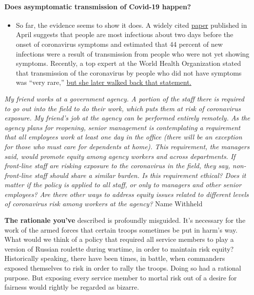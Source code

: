 \begin{itemize}
{  \paragraph{Does asymptomatic transmission of Covid-19
  happen?}\label{does-asymptomatic-transmission-of-covid-19-happen}}

  \begin{itemize}
  \tightlist
  \item
    So far, the evidence seems to show it does. A widely cited
    \href{https://www.nature.com/articles/s41591-020-0869-5}{paper}
    published in April suggests that people are most infectious about
    two days before the onset of coronavirus symptoms and estimated that
    44 percent of new infections were a result of transmission from
    people who were not yet showing symptoms. Recently, a top expert at
    the World Health Organization stated that transmission of the
    coronavirus by people who did not have symptoms was ``very rare,''
    \href{https://www.nytimes.com/2020/06/09/world/coronavirus-updates.html?action=click\&pgtype=Article\&state=default\&region=MAIN_CONTENT_3\&context=storylines_faq\#link-1f302e21}{but
    she later walked back that statement.}
  \end{itemize}
\end{itemize}

\emph{My friend works at a government agency. A portion of the staff
there is required to go out into the field to do their work, which puts
them at risk of coronavirus exposure. My friend's job at the agency can
be performed entirely remotely. As the agency plans for reopening,
senior management is contemplating a requirement that all employees work
at least one day in the office (there will be an exception for those who
must care for dependents at home). This requirement, the managers said,
would promote equity among agency workers and across departments. If
front-line staff are risking exposure to the coronavirus in the field,
they say, non-front-line staff should share a similar burden. Is this
requirement ethical? Does it matter if the policy is applied to all
staff, or only to managers and other senior employees? Are there other
ways to address equity issues related to different levels of coronavirus
risk among workers at the agency?} Name Withheld

\textbf{The rationale you've} described is profoundly misguided. It's
necessary for the work of the armed forces that certain troops sometimes
be put in harm's way. What would we think of a policy that required all
service members to play a version of Russian roulette during wartime, in
order to maintain risk equity? Historically speaking, there have been
times, in battle, when commanders exposed themselves to risk in order to
rally the troops. Doing so had a rational purpose. But exposing every
service member to mortal risk out of a desire for fairness would rightly
be regarded as bizarre.

